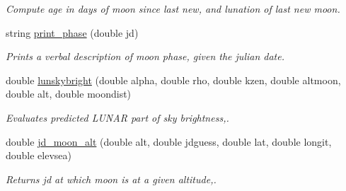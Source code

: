 \begin{DoxyCompactItemize}
\begin{DoxyCompactList}\small\item\em Compute age in days of moon since last new, and lunation of last new moon. \end{DoxyCompactList}\item 
\hypertarget{class_moon_a107a94687414b9d16feecfc14e7e5bd7}{string \hyperlink{class_moon_a107a94687414b9d16feecfc14e7e5bd7}{print\-\_\-phase} (double jd)}\label{class_moon_a107a94687414b9d16feecfc14e7e5bd7}

\begin{DoxyCompactList}\small\item\em Prints a verbal description of moon phase, given the julian date. \end{DoxyCompactList}\item 
double \hyperlink{class_moon_a2de7e6bc41561110631d2ebbf1e5769a}{lunskybright} (double alpha, double rho, double kzen, double altmoon, double alt, double moondist)
\begin{DoxyCompactList}\small\item\em Evaluates predicted L\-U\-N\-A\-R part of sky brightness,. \end{DoxyCompactList}\item 
double \hyperlink{class_moon_ad80e14368d17b200e87494fb26ef63f7}{jd\-\_\-moon\-\_\-alt} (double alt, double jdguess, double lat, double longit, double elevsea)
\begin{DoxyCompactList}\small\item\em Returns jd at which moon is at a given altitude,. \end{DoxyCompactList}\end{DoxyCompactItemize}
